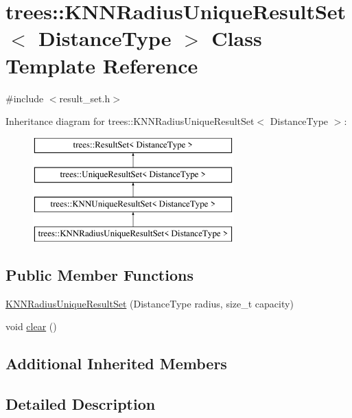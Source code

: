 \hypertarget{classtrees_1_1_k_n_n_radius_unique_result_set}{}\section{trees\+:\+:K\+N\+N\+Radius\+Unique\+Result\+Set$<$ Distance\+Type $>$ Class Template Reference}
\label{classtrees_1_1_k_n_n_radius_unique_result_set}


{\ttfamily \#include $<$result\+\_\+set.\+h$>$}

Inheritance diagram for trees\+:\+:K\+N\+N\+Radius\+Unique\+Result\+Set$<$ Distance\+Type $>$\+:\begin{figure}[H]
\begin{center}
\leavevmode
\includegraphics[height=4.000000cm]{classtrees_1_1_k_n_n_radius_unique_result_set}
\end{center}
\end{figure}
\subsection*{Public Member Functions}
\begin{DoxyCompactItemize}
\item 
\hyperlink{classtrees_1_1_k_n_n_radius_unique_result_set_ab20dd750c139d441ab3d715a4b4f1bac}{K\+N\+N\+Radius\+Unique\+Result\+Set} (Distance\+Type radius, size\+\_\+t capacity)
\item 
void \hyperlink{classtrees_1_1_k_n_n_radius_unique_result_set_abf3186df7ed3776c34d824b768975ff9}{clear} ()
\end{DoxyCompactItemize}
\subsection*{Additional Inherited Members}


\subsection{Detailed Description}
